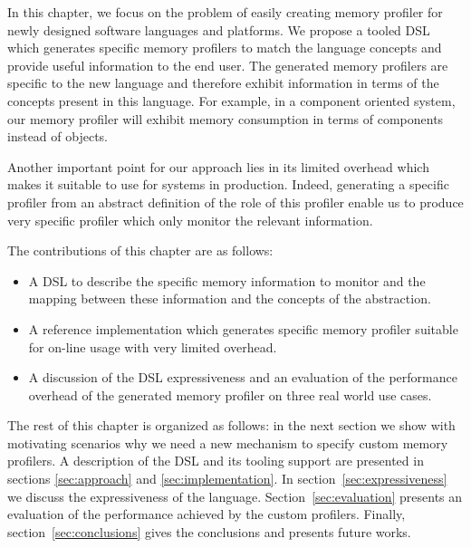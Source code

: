 In this chapter, we focus on the problem of easily creating memory profiler for newly designed software languages and platforms. 
We propose a tooled DSL which generates specific memory profilers to match the language concepts and provide useful information to the end user. 
The generated memory profilers are specific to the new language and therefore exhibit information in terms of the concepts present in this language. 
For example, in a component oriented system, our memory profiler will exhibit memory consumption in terms of components instead of objects.

Another important point for our approach lies in its limited overhead which makes it suitable to use for systems in production.
Indeed, generating a specific profiler from an abstract definition of the role of this profiler enable us to produce very specific profiler which only monitor the relevant information.

The contributions of this chapter are as follows:
\begin{itemize}
\item A DSL to describe the specific memory information to monitor and the mapping between these information and the concepts of the abstraction. 
\item A reference implementation which generates specific memory profiler suitable for on-line usage with very limited overhead.
\item A discussion of the DSL expressiveness and an evaluation of the performance overhead of the generated memory profiler on three real world use cases.
\end{itemize}

The rest of this chapter is organized as follows: in the next section we show with motivating scenarios why we need a new mechanism to specify custom memory profilers.
A description of the DSL and its tooling support are presented in sections
\ref{sec:approach} and \ref{sec:implementation}.
In section~\ref{sec:expressiveness} we discuss the expressiveness of the language.
Section~\ref{sec:evaluation} presents an evaluation of the performance achieved by the custom profilers.
Finally, section~\ref{sec:conclusions} gives the conclusions and presents future works.